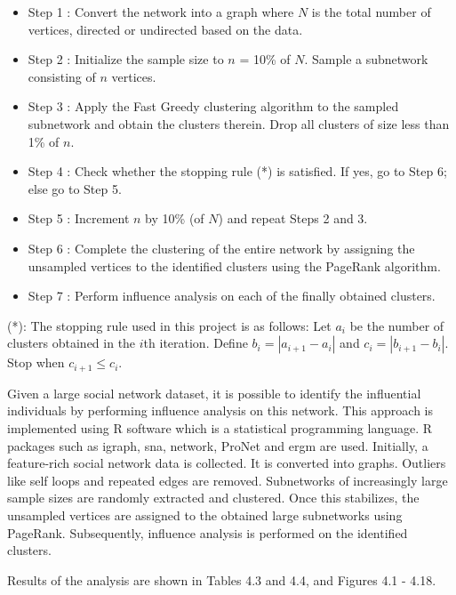 \begin{itemize}
\item Step 1 :  Convert the network into a graph where $N$ is the total number of vertices,
directed or undirected based on the data.
\item Step 2 :  Initialize the sample size to $n$ = 10\% of $N$.
Sample a subnetwork consisting of $n$ vertices.
\item Step 3 : Apply the Fast Greedy clustering algorithm to the sampled subnetwork and
obtain the clusters therein. Drop all clusters of size less than 1\% of $n$.
\item Step 4 : Check whether the stopping rule (*) is satisfied. If yes, go to Step 6;
else go to Step 5.
\item Step 5 : Increment $n$ by 10\% (of $N$) and repeat Steps 2 and 3.
\item Step 6 : Complete the clustering of the entire network by assigning the unsampled
vertices to the identified clusters using the PageRank algorithm.
\item Step 7 : Perform influence analysis on each of the finally obtained clusters.
\end{itemize}
(*): The stopping rule used in this project is as follows: Let $a_i$ be the number of clusters
obtained in the $i$th iteration. Define $b_i = |a_{i+1}-a_i|$ and $c_i = |b_{i+1}-b_i|$. Stop
when $c_{i+1}\le c_i$.


Given a large social network dataset, it is possible to identify the influential individuals
by performing influence analysis on this network.
This approach is implemented using R software which is a statistical programming language.
R packages such as igraph, sna, network, ProNet and ergm are used. Initially, a feature-rich
social network data is collected. It is converted into graphs. Outliers like self loops and repeated edges
are removed. Subnetworks of increasingly large sample sizes are randomly extracted and
clustered. Once this stabilizes, the unsampled vertices are assigned to the obtained large
subnetworks using PageRank. Subsequently, influence analysis is performed on the identified clusters.


Results of the analysis are shown in Tables 4.3 and 4.4, and Figures 4.1 - 4.18.

